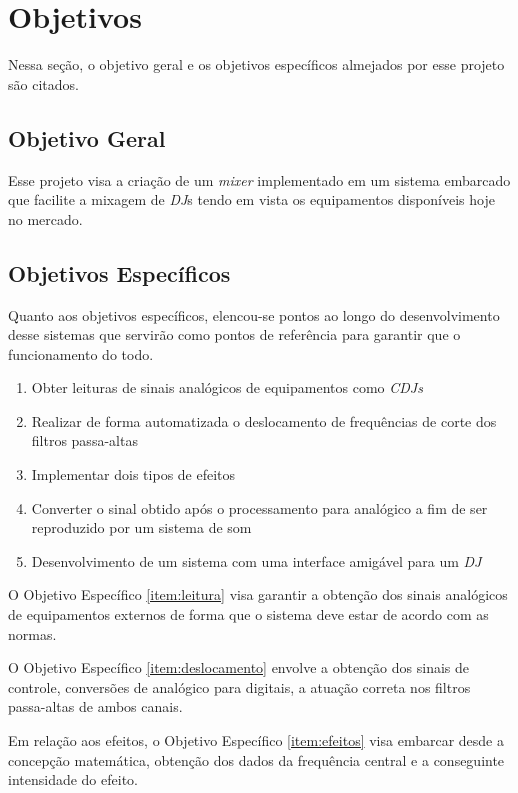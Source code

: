 \section{Objetivos}

Nessa seção, o objetivo geral e os objetivos específicos almejados por esse projeto são citados.

\subsection{Objetivo Geral}
Esse projeto visa a criação de um \textit{mixer} implementado em um sistema embarcado que facilite a mixagem de \textit{DJ}s tendo em vista os equipamentos disponíveis hoje no mercado.

\subsection{Objetivos Específicos}

Quanto aos objetivos específicos, elencou-se pontos ao longo do desenvolvimento desse sistemas que servirão como pontos de referência para garantir que o funcionamento do todo. 

\begin{enumerate}
    \item \label{item:leitura} Obter leituras de sinais analógicos de equipamentos como \textit{CDJs}
    \item \label{item:deslocamento} Realizar de forma automatizada o deslocamento de frequências de corte dos filtros passa-altas
    \item \label{item:efeitos} Implementar dois tipos de efeitos
    \item \label{item:conversao} Converter o sinal obtido após o processamento para analógico a fim de ser reproduzido por um sistema de som
    \item \label{item:interface} Desenvolvimento de um sistema com uma interface amigável para um \textit{DJ}
\end{enumerate}

O Objetivo Específico \ref{item:leitura} visa garantir a obtenção dos sinais analógicos de equipamentos externos de forma que o sistema deve estar de acordo com as normas. 

O Objetivo Específico \ref{item:deslocamento} envolve a obtenção dos sinais de controle, conversões de analógico para digitais, a atuação correta nos filtros passa-altas de ambos canais.

Em relação aos efeitos, o Objetivo Específico \ref{item:efeitos} visa embarcar desde a concepção matemática, obtenção dos dados da frequência central e a conseguinte intensidade do efeito. 

